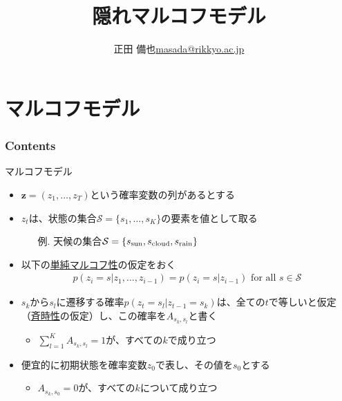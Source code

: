 \documentclass[aspectratio=169,unicode,dvipdfmx,14pt]{beamer}
\title{ \\隠れマルコフモデル}
\author{\texorpdfstring{正田 備也\newline\href{mailto:masada@rikkyo.ac.jp}{masada@rikkyo.ac.jp}}{正田 備也}}
\date{}
\begin{document}
\begin{frame}
\titlepage
\end{frame}

\section{マルコフモデル}

\begin{frame}\frametitle{Contents}
\Large \tableofcontents[currentsection]
\end{frame}

\begin{frame}{マルコフモデル}
\begin{itemize}
\item $\bm{z} = (z_1,\ldots,z_T)$という確率変数の列があるとする
\item $z_t$は、状態の集合$\mathcal{S} = \{ s_1, \ldots, s_K \}$の要素を値として取る
\begin{itemize}
\item[例.] 天候の集合$\mathcal{S} = \{ s_{\mbox{\scriptsize sun}}, s_{\mbox{\scriptsize cloud}}, s_{\mbox{\scriptsize rain}} \}$
\end{itemize}
\item 以下の\underline{単純マルコフ性}の仮定をおく
\vspace{-.1in}
\begin{align}
p(z_i =s | z_1,\ldots, z_{i-1}) = p(z_i =s | z_{i-1}) \mbox{ for all $s \in \mathcal{S}$}
\end{align}
\item $s_k$から$s_l$に遷移する確率$p(z_t=s_l|z_{t-1}=s_k)$は、全ての$t$で等しいと仮定（\underline{斉時性}の仮定）し、この確率を$A_{s_k,s_l}$と書く
\begin{itemize}
\item $\sum_{l=1}^K A_{s_k, s_l} = 1$が、すべての$k$で成り立つ
\end{itemize}
\item 便宜的に初期状態を確率変数$z_0$で表し、その値を$s_0$とする
\begin{itemize}
\item $A_{s_k,s_0} = 0$が、すべての$k$について成り立つ
\end{itemize}
\end{itemize}
\end{frame}
\end{document}
